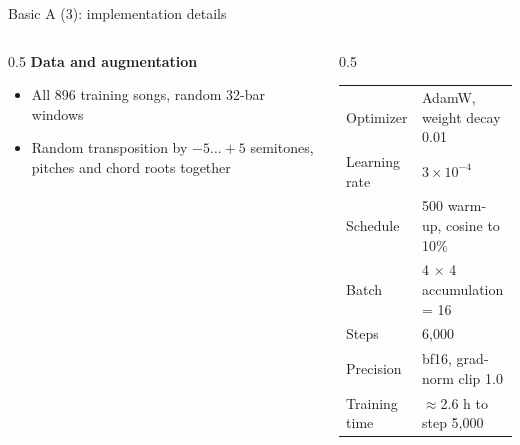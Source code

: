 \documentclass[aspectratio=169,11pt]{beamer}
\newenvironment{tight}{\begin{itemize}\setlength{\itemsep}{1.5pt}\setlength{\parskip}{0pt}\setlength{\topsep}{0pt}}{\end{itemize}}
\begin{document}
\begin{frame}[t]{Basic A (3): implementation details}
  \begin{columns}[T]
    \begin{column}{0.5\textwidth}
      \textbf{Data and augmentation}
      \begin{tight}\small
        \item All 896 training songs, random 32-bar windows
        \item Random transposition by $-5\dots+5$ semitones, pitches and chord roots together
      \end{tight}
    \end{column}
    \begin{column}{0.5\textwidth}
      \small
      \begin{tabular}{@{}ll@{}}
        \toprule
        Optimizer & AdamW, weight decay 0.01 \\
        Learning rate & $3{\times}10^{-4}$ \\
        Schedule & 500 warm-up, cosine to 10\% \\
        Batch & 4 $\times$ 4 accumulation = 16 \\
        Steps & 6{,}000 \\
        Precision & bf16, grad-norm clip 1.0 \\
        Training time & $\approx$2.6 h to step 5{,}000 \\
        \bottomrule
      \end{tabular}
    \end{column}
  \end{columns}
\end{frame}
\end{document}
